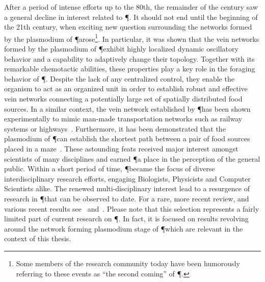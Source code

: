 		After a period of intense efforts up to the 80th, the remainder of the century saw a general decline in interest related to \P. It should not end until the beginning of the 21th century, when exciting new question surrounding the networks formed by the plasmodium of \P arose\footnote{Some members of the research community today have been humorously referring to these events as ``the second coming'' of \P.}. In particular, it was shown that the vein networks formed by the plasmodium of \P exhibit highly localized dynamic oscillatory behavior and a capability to adaptively change their topology. Together with its remarkable chemotactic abilities, these properties play a key role in the foraging behavior of \P. Despite the lack of any centralized control, they enable the organism to act as an organized unit in order to establish robust and effective vein networks connecting a potentially large set of spatially distributed food sources. In a similar context, the vein network established by \P has been shown experimentally to mimic man-made transportation networks such as railway systems or highways~\cite{tero2010rules,tero2006physarum,nakagaki2004smart}. Furthermore, it has been demonstrated that the plasmodium of \P can establish the shortest path between a pair of food sources placed in a maze~\cite{nakagaki2000intelligence}. These astounding feats received major interest amongst scientists of many disciplines and earned \P a place in the perception of the general public. Within a short period of time, \P became the focus of diverse interdisciplinary research efforts, engaging Biologists, Physicists and Computer Scientists alike. The renewed multi-disciplinary interest lead to a resurgence of research in \P that can be observed to date. For a rare, more recent review, and various recent results see~\cite{ueda2005intelligent} and~\cite{takamatsu2009environment,shirakawa2007emergence,alim2013random,Tero2007553,nakagaki2004obtaining}. Please note that this selection represents a fairly limited part of current research on \P. In fact, it is focused on results revolving around the network forming plasmodium stage of \P which are relevant in the context of this thesis.

		\FloatBarrier
